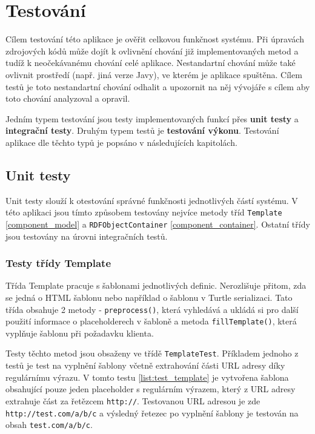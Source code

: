 \documentclass[thesis=B,czech]{FITthesis}[2012/06/26]
\begin{document}
  
  \chapter{Testování}  
  Cílem testování této aplikace je ověřit celkovou funkčnost systému.  
  Při úpravách zdrojových kódů může dojít k ovlivnění chování již implementovaných metod
  a tudíž k neočekávanému chování celé aplikace. Nestandartní chování může také ovlivnit prostředí (např. jiná verze Javy), ve kterém je aplikace spuštěna.
  Cílem testů je toto nestandartní chování odhalit a upozornit na něj vývojáře s cílem aby toto chování analyzoval a opravil.
  
  Jedním typem testování jsou testy implementovaných funkcí přes \textbf{unit testy} a \textbf{integrační testy}.
  Druhým typem testů je \textbf{testování výkonu}. Testování aplikace dle těchto typů je popsáno v následujících kapitolách.
    
  \section{Unit testy}
  Unit testy slouží k otestování správné funkčnosti jednotlivých částí systému. 
  V této aplikaci jsou tímto způsobem testovány nejvíce metody tříd \texttt{Template} \ref{component_model} a \texttt{RDFObjectContainer} \ref{component_container}.
  Ostatní třídy jsou testovány na úrovni integračních testů.
  
  \subsection{Testy třídy Template}
  Třída Template pracuje s šablonami jednotlivých definic. Nerozlišuje přitom, zda se jedná o HTML šablonu nebo například o šablonu v Turtle serializaci.
  Tato třída obsahuje 2 metody - \texttt{preprocess()}, která vyhledává a ukládá si pro další použití informace o placeholderech v šabloně a metoda
  \texttt{fillTemplate()}, která vyplňuje šablonu při požadavku klienta.
  
  Testy těchto metod jsou obsaženy ve třídě \texttt{TemplateTest}. Příkladem jednoho z testů je test na vyplnění šablony včetně extrahování
  části URL adresy díky regulárnímu výrazu.
  V tomto testu \ref{list:test_template} je vytvořena šablona obsahující pouze jeden placeholder s regulárním výrazem, který z 
  URL adresy extrahuje část za řetězcem \texttt{http://}.
  Testovanou URL adresou je zde \texttt{http://test.com/a/b/c} a výsledný řetezec po vyplnění šablony je testován na obsah \texttt{test.com/a/b/c}.
  
\end{document}
